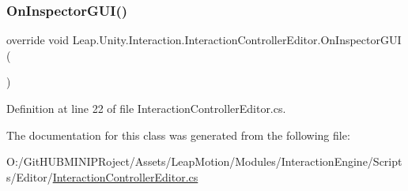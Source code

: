 \subsubsection{\texorpdfstring{OnInspectorGUI()}{OnInspectorGUI()}}
{\footnotesize\ttfamily override void Leap.\+Unity.\+Interaction.\+Interaction\+Controller\+Editor.\+On\+Inspector\+G\+UI (\begin{DoxyParamCaption}{ }\end{DoxyParamCaption})}



Definition at line 22 of file Interaction\+Controller\+Editor.\+cs.



The documentation for this class was generated from the following file\+:\begin{DoxyCompactItemize}
\item 
O\+:/\+Git\+H\+U\+B\+M\+I\+N\+I\+P\+Roject/\+Assets/\+Leap\+Motion/\+Modules/\+Interaction\+Engine/\+Scripts/\+Editor/\mbox{\hyperlink{_interaction_controller_editor_8cs}{Interaction\+Controller\+Editor.\+cs}}\end{DoxyCompactItemize}
